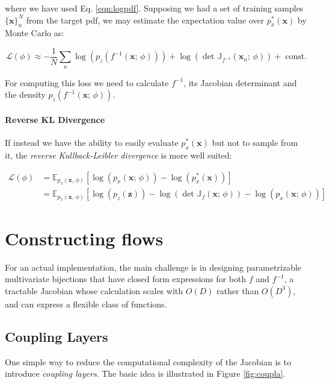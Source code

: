 where we have used Eq. \ref{eqn:logpdf}. Supposing we had a set of training samples $\{\mathbf{x}\}^N_n$ from the target pdf, we may estimate the expectation value over $p_x^*(\mathbf{x})$ by Monte Carlo as:

\[
\mathcal{L}(\phi) \approx -\frac{1}{N} \sum_n \log(p_z(f^{-1}(\mathbf{x}; \, \phi)))+\log\left(\det\mathbb{J}_{f^{-1}}(\mathbf{x}_n; \, \phi)\right) +\; \text{const.}
\]

For computing this loss we need to calculate $f^{-1}$, its Jacobian determinant and the density $p_z(f^{-1}(\mathbf{x}; \, \phi))$. 

\paragraph{Reverse KL Divergence} If instead we have the ability to easily evaluate $p_x^*(\mathbf{x})$ but not to sample from it, the \emph{reverse Kullback-Leibler divergence} is more well suited:

\[
\begin{aligned}
    \mathcal{L}(\phi) &= \mathbb{E}_{p_x(\mathbf{x}, \, \phi)}[\log(p_x(\mathbf{x}; \, \phi)) - \log(p_x^*(\mathbf{x}))]\\
    &= \mathbb{E}_{p_x(\mathbf{x}, \, \phi)}[\log(p_z(\mathbf{z}))-\log\left(\det\mathbb{J}_{f}(\mathbf{x}; \, \phi)\right)-\log(p_x(\mathbf{x}; \, \phi))]
\end{aligned}
\]

\section{Constructing flows}
For an actual implementation, the main challenge is in designing parametrizable multivariate bijections that have closed form expressions for both $f$ and $f^{-1}$, a tractable Jacobian whose calculation scales with $O(D)$ rather than $O(D^3)$, and can express a flexible class of functions.

\subsection{Coupling Layers}

One simple way to reduce the computational complexity of the Jacobian is to introduce \emph{coupling layers}. The basic idea is illustrated in Figure \ref{fig:coupla}.


